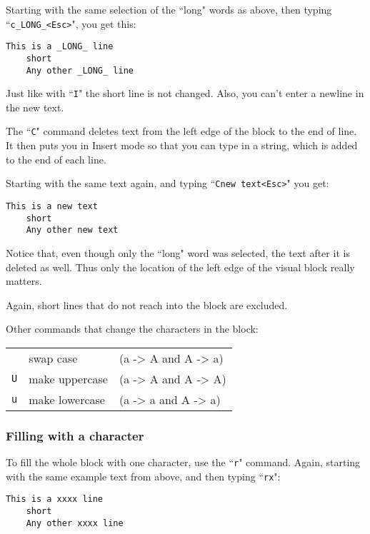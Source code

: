 Starting with the same selection of the ``long" words as above, then typing ``\texttt{c\_LONG\_<Esc>}", you get this:

\begin{Verbatim}[samepage=true]
    This is a _LONG_ line
    short
    Any other _LONG_ line
\end{Verbatim}

Just like with ``\texttt{I}" the short line is not changed.
Also, you can't enter a newline in the new text.

The ``\texttt{C}" command deletes text from the left edge of the block to the end of line.
It then puts you in Insert mode so that you can type in a string, which is added to the end of each line.

Starting with the same text again, and typing ``\texttt{Cnew text<Esc>}" you get:

\begin{Verbatim}[samepage=true]
    This is a new text
    short
    Any other new text
\end{Verbatim}

Notice that, even though only the ``long" word was selected, the text after it is deleted as well.
Thus only the location of the left edge of the visual block really matters.

Again, short lines that do not reach into the block are excluded.

Other commands that change the characters in the block:

\begin{center} \begin{tabular}{l l l}
	\texttt{~} & swap case & (a -> A and A -> a) \\
	\texttt{U} & make uppercase & (a -> A and A -> A) \\
	\texttt{u} & make lowercase & (a -> a and A -> a) \\
\end{tabular} \end{center}

\subsubsection{Filling with a character}
To fill the whole block with one character, use the ``\texttt{r}" command.
Again, starting with the same example text from above, and then typing ``\texttt{rx}":

\begin{Verbatim}[samepage=true]
    This is a xxxx line
    short
    Any other xxxx line
\end{Verbatim}

